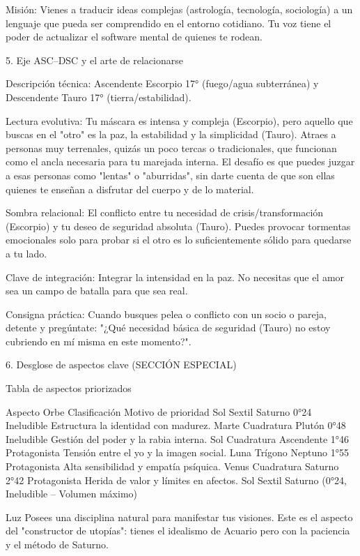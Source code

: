 Misión: Vienes a traducir ideas complejas (astrología, tecnología, sociología) a un lenguaje que pueda ser comprendido en el entorno cotidiano. Tu voz tiene el poder de actualizar el software mental de quienes te rodean.

5. Eje ASC–DSC y el arte de relacionarse

Descripción técnica: Ascendente Escorpio 17° (fuego/agua subterránea) y Descendente Tauro 17° (tierra/estabilidad).

Lectura evolutiva: Tu máscara es intensa y compleja (Escorpio), pero aquello que buscas en el "otro" es la paz, la estabilidad y la simplicidad (Tauro). Atraes a personas muy terrenales, quizás un poco tercas o tradicionales, que funcionan como el ancla necesaria para tu marejada interna. El desafío es que puedes juzgar a esas personas como "lentas" o "aburridas", sin darte cuenta de que son ellas quienes te enseñan a disfrutar del cuerpo y de lo material.

Sombra relacional: El conflicto entre tu necesidad de crisis/transformación (Escorpio) y tu deseo de seguridad absoluta (Tauro). Puedes provocar tormentas emocionales solo para probar si el otro es lo suficientemente sólido para quedarse a tu lado.

Clave de integración: Integrar la intensidad en la paz. No necesitas que el amor sea un campo de batalla para que sea real.

Consigna práctica: Cuando busques pelea o conflicto con un socio o pareja, detente y pregúntate: "¿Qué necesidad básica de seguridad (Tauro) no estoy cubriendo en mí misma en este momento?".

6. Desglose de aspectos clave (SECCIÓN ESPECIAL)

Tabla de aspectos priorizados

Aspecto	Orbe	Clasificación	Motivo de prioridad
Sol Sextil Saturno	0°24	Ineludible	Estructura la identidad con madurez.
Marte Cuadratura Plutón	0°48	Ineludible	Gestión del poder y la rabia interna.
Sol Cuadratura Ascendente	1°46	Protagonista	Tensión entre el yo y la imagen social.
Luna Trígono Neptuno	1°55	Protagonista	Alta sensibilidad y empatía psíquica.
Venus Cuadratura Saturno	2°42	Protagonista	Herida de valor y límites en afectos.
Sol Sextil Saturno (0°24, Ineludible – Volumen máximo)

Luz Posees una disciplina natural para manifestar tus visiones. Este es el aspecto del "constructor de utopías": tienes el idealismo de Acuario pero con la paciencia y el método de Saturno.

